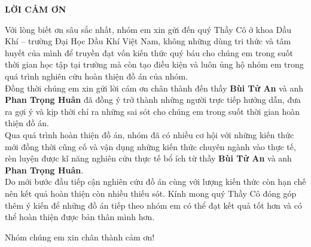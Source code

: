 \documentclass[12pt,a4paper]{article}
\begin{document}
\clearpage

\thispagestyle{empty}

\begin{center}
	\centering
	\textbf{LỜI CẢM ƠN}
\end{center}
Với lòng biết ơn sâu sắc nhất, nhóm em xin gửi đến quý Thầy Cô ở khoa Dầu Khí –
trường Đại Học Dầu Khí Việt Nam, không những dùng tri thức và tâm huyết của mình để truyền đạt vốn kiến thức quý báu cho chúng em trong suốt thời gian học tập tại trường mà còn tạo điều kiện và luôn ủng hộ nhóm em trong quá trình nghiên cứu hoàn thiện đồ án của nhóm. \\
Đồng thời chúng em xin gửi lời cám ơn chân thành đến thầy \textbf{Bùi Tử An} và anh \textbf{Phan Trọng Huân} đã đồng ý trở thành những người trực tiếp hướng dẫn, đưa ra gợi ý và kịp thời chỉ ra những sai sót cho chúng em trong suốt thời gian hoàn thiện đồ án.\\
Qua quá trình hoàn thiện đồ án, nhóm đã có nhiều cơ hội với những kiến thức mới đồng thời cũng cố và vận dụng những kiến thức chuyên ngành vào thực tế, rèn luyện được kĩ năng nghiên cứu thực tế bổ ích từ thầy \textbf{Bùi Tử An} và anh \textbf{Phan Trọng Huân}.\\
Do mới bước đầu tiếp cận nghiên cứu đồ án cùng với lượng kiến thức còn hạn chế nên kết quả hoàn thiện còn nhiều thiếu sót. Kính mong quý Thầy Cô đóng góp thêm ý kiến để những đồ án tiếp theo nhóm em có thể đạt kết quả tốt hơn và có thể hoàn thiện được bản thân mình hơn.
\begin{flushright}
Nhóm chúng em xin chân thành cảm ơn!
\end{flushright}
\newpage
\tableofcontents

\listoftables
{}

\newpage
\listoffigures
{}

\newpage
\end{document}
